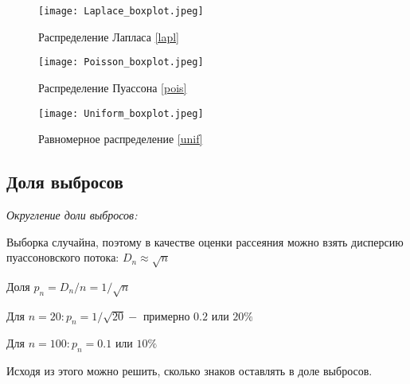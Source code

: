 \documentclass[a4paper]{article}
\begin{document}
        \begin{figure}[H]
            \centering
            \texttt{[image: Laplace\_boxplot.jpeg]}
            \caption{Распределение Лапласа \eqref{lapl}}
            \label{fig:laplace}
        \end{figure}
        
        \begin{figure}[H]
            \centering
            \texttt{[image: Poisson\_boxplot.jpeg]}
            \caption{Распределение Пуассона \eqref{pois}}
            \label{fig:poisson}
        \end{figure}
        
        \begin{figure}[H]
            \centering
            \texttt{[image: Uniform\_boxplot.jpeg]}
            \caption{Равномерное распределение \eqref{unif}}
            \label{fig:uniform}
        \end{figure}
    \subsection{Доля выбросов}
    
        \textit{Округление доли выбросов:}
        
        Выборка случайна, поэтому в качестве оценки рассеяния можно взять дисперсию пуассоновского потока: $D_n \approx \sqrt{n}$
        
        Доля $p_n = D_n / n = 1 / \sqrt{n}$
        
        Для $n = 20: p_n = 1 / \sqrt{20} -$ примерно $0.2$ или $20\%$
        
        Для $n = 100: p_n = 0.1$ или $10\%$
        
        Исходя из этого можно решить, сколько знаков оставлять в доле выбросов.
        
\end{document}
